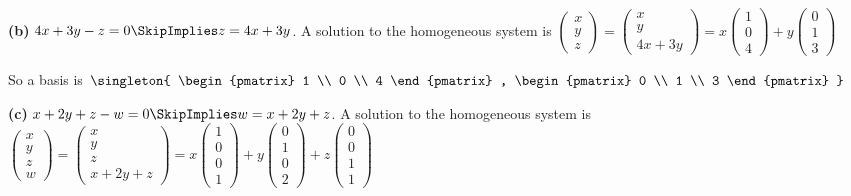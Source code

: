 \documentclass[oneside,12pt]{amsart}
\begin{document}
\bigskip

\textbf{(b)} $4x+3y-z=0 \SkipImplies z = 4x+3y$. A solution to the homogeneous system
is
$
\begin{pmatrix}
x \\ y \\ z
\end{pmatrix}
=
\begin{pmatrix}
x \\ y \\ 4x+3y
\end{pmatrix}
=
x
\begin{pmatrix}
1 \\ 0 \\ 4
\end{pmatrix}
+
y
\begin{pmatrix}
0 \\ 1 \\ 3
\end{pmatrix}
$

So a basis is
$
\singleton{
\begin{pmatrix}
1 \\ 0 \\ 4
\end{pmatrix}
,
\begin{pmatrix}
0 \\ 1 \\ 3
\end{pmatrix}
}
$

\bigskip

\textbf{(c)} $x+2y+z-w=0 \SkipImplies w = x+2y+z$. A solution to the homogeneous system
is
$
\begin{pmatrix}
x \\ y \\ z \\ w
\end{pmatrix}
=
\begin{pmatrix}
x \\ y \\z \\ x+2y+z
\end{pmatrix}
=
x
\begin{pmatrix}
1 \\ 0 \\ 0 \\ 1
\end{pmatrix}
+
y
\begin{pmatrix}
0 \\ 1 \\ 0 \\ 2
\end{pmatrix}
+
z
\begin{pmatrix}
0 \\ 0\\ 1 \\ 1
\end{pmatrix}
$
\end{document}
